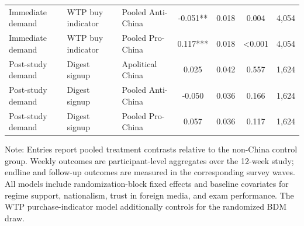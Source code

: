 \begin{table}[H]
\begin{threeparttable}
\begin{tabular}{lllcccc}
Immediate demand & WTP buy indicator & Pooled Anti-China & -0.051** & 0.018 & 0.004 & 4,054 \\
Immediate demand & WTP buy indicator & Pooled Pro-China & 0.117*** & 0.018 & <0.001 & 4,054 \\
Post-study demand & Digest signup & Apolitical China & 0.025 & 0.042 & 0.557 & 1,624 \\
Post-study demand & Digest signup & Pooled Anti-China & -0.050 & 0.036 & 0.166 & 1,624 \\
Post-study demand & Digest signup & Pooled Pro-China & 0.057 & 0.036 & 0.117 & 1,624 \\
\bottomrule
\end{tabular}
\begin{tablenotes}[flushleft]
\footnotesize
\item Note: Entries report pooled treatment contrasts relative to the non-China control group. Weekly outcomes are participant-level aggregates over the 12-week study; endline and follow-up outcomes are measured in the corresponding survey waves. All models include randomization-block fixed effects and baseline covariates for regime support, nationalism, trust in foreign media, and exam performance. The WTP purchase-indicator model additionally controls for the randomized BDM draw.
\end{tablenotes}
\end{threeparttable}
\end{table}
